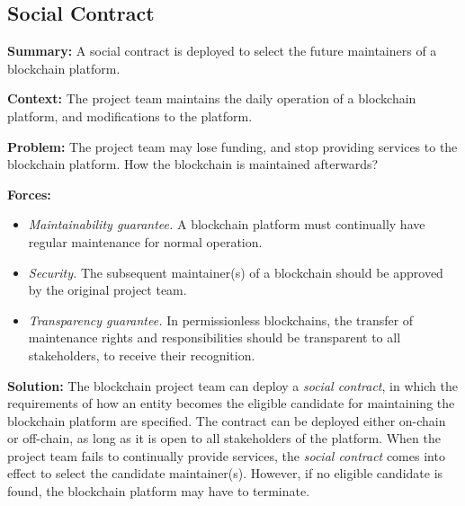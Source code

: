 \documentclass{article}
\begin{document}
\subsection{Social Contract}

\vspace{0.5em}\noindent \textbf{Summary:} A social contract is deployed to select the future maintainers of a blockchain platform.


\vspace{0.5em}\noindent \textbf{Context:} The project team maintains the daily operation of a blockchain platform,  and modifications to the platform.

\vspace{0.5em}\noindent \textbf{Problem:} The project team may lose funding, and stop providing services to the blockchain platform. How the blockchain is maintained afterwards?

\vspace{0.5em}\noindent \textbf{Forces:} 

\begin{itemize}
  \item \textit{Maintainability guarantee.} A blockchain platform must continually have regular maintenance for normal operation.

  
  \item \textit{Security.} The subsequent maintainer(s) of a blockchain should be approved by the original project team.
  
  \item \textit{Transparency guarantee.} In permissionless blockchains, the transfer of maintenance rights and responsibilities should be transparent to all stakeholders, to receive their recognition.

\end{itemize}

\vspace{0.5em}\noindent \textbf{Solution:} 
The blockchain project team can deploy a \textit{social contract}, in which the requirements of how an entity becomes the eligible candidate for maintaining the blockchain platform are specified. The contract can be deployed either on-chain or off-chain, as long as it is open to all stakeholders of the platform. When the project team fails to continually provide services, the \textit{social contract} comes into effect to select the candidate maintainer(s). However, if no eligible candidate is found, the blockchain platform may have to terminate.
\end{document}
